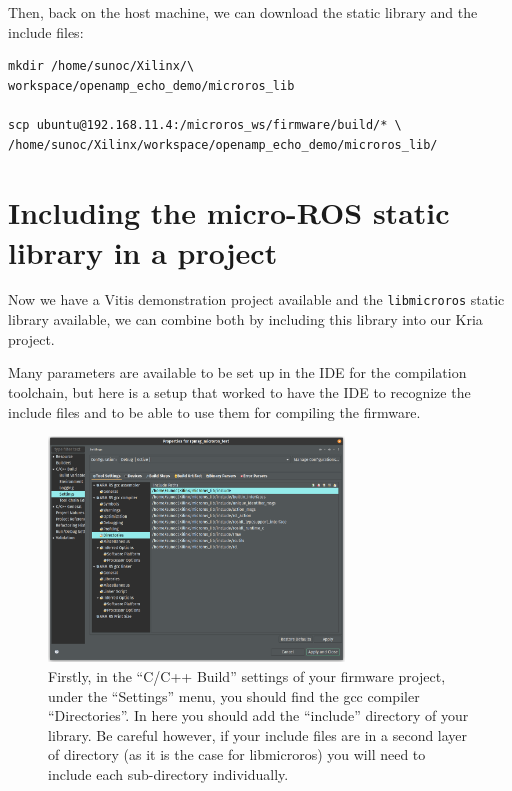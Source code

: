 \documentclass[10pt]{article}
\begin{document}
Then, back on the host machine, we can download the static library and the include files:
\begin{tcolorbox}
\begin{verbatim}
mkdir /home/sunoc/Xilinx/\
workspace/openamp_echo_demo/microros_lib

scp ubuntu@192.168.11.4:/microros_ws/firmware/build/* \
/home/sunoc/Xilinx/workspace/openamp_echo_demo/microros_lib/
\end{verbatim}
\end{tcolorbox}



\section{Including the micro-ROS static library in a project}
Now we have a Vitis demonstration project available and the \verb|libmicroros| static library
available, we can combine both by including this library into our Kria project.

Many parameters are available to be set up in the IDE for the compilation toolchain, but here is
a setup that worked to have the IDE to recognize the include files and to be able to use them
for compiling the firmware.

\label{sec:including-micro-ros}
\begin{figure}[H]
  \centering
  \includegraphics[width=0.7\textwidth]{./img/vitis_new/include}
  \caption{Firstly, in the ``C/C++ Build'' settings of your firmware project, under the ``Settings'' menu, you should find the gcc compiler
    ``Directories''. In here you should add the ``include'' directory of your library. Be careful however, if your include files are in
  a second layer of directory (as it is the case for libmicroros) you will need to include each sub-directory individually.}
  \label{fig:include1}
\end{figure}
\end{document}
